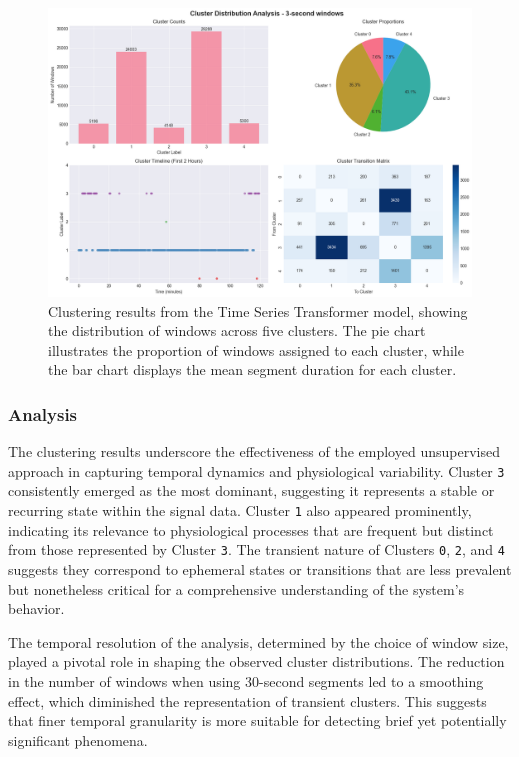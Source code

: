 \documentclass[a4paper,12pt,twoside]{article}
\begin{document}
\begin{figure}[H]
\centering
\includegraphics[width=1.0\textwidth]{img/tst clusters distribution.png}
\caption{Clustering results from the Time Series Transformer model, showing the distribution of windows across five clusters. The pie chart illustrates the proportion of windows assigned to each cluster, while the bar chart displays the mean segment duration for each cluster.}
\label{fig:tst_clustering_results}
\end{figure}


\subsubsection{Analysis}

The clustering results underscore the effectiveness of the employed unsupervised approach in capturing temporal dynamics and physiological variability. Cluster \texttt{3} consistently emerged as the most dominant, suggesting it represents a stable or recurring state within the signal data. Cluster \texttt{1} also appeared prominently, indicating its relevance to physiological processes that are frequent but distinct from those represented by Cluster \texttt{3}. The transient nature of Clusters \texttt{0}, \texttt{2}, and \texttt{4} suggests they correspond to ephemeral states or transitions that are less prevalent but nonetheless critical for a comprehensive understanding of the system's behavior.

The temporal resolution of the analysis, determined by the choice of window size, played a pivotal role in shaping the observed cluster distributions. The reduction in the number of windows when using 30-second segments led to a smoothing effect, which diminished the representation of transient clusters. This suggests that finer temporal granularity is more suitable for detecting brief yet potentially significant phenomena. 
\end{document}
